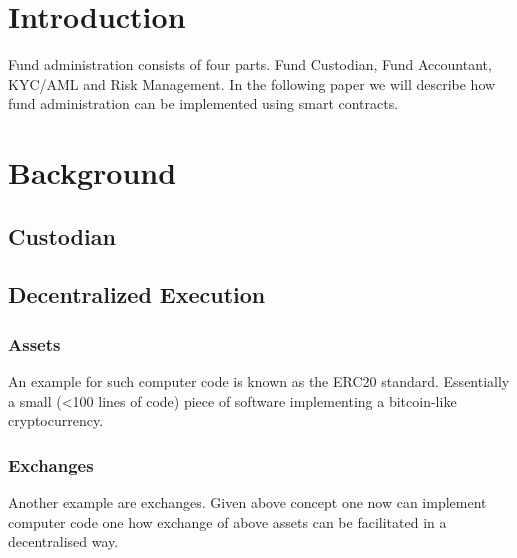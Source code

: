 \documentclass[conference]{IEEEtran}
\begin{document}




%
\IEEEpeerreviewmaketitle



\section{Introduction}

Fund administration consists of four parts. Fund Custodian, Fund Accountant, KYC/AML and Risk Management. In the following paper we will describe how fund administration can be implemented using smart contracts.

\section{Background}

\subsection{Custodian}

\subsection{Decentralized Execution}

\subsubsection{Assets}

An example for such computer code is known as the ERC20 standard. Essentially a small (<100 lines of code) piece of software implementing a bitcoin-like cryptocurrency.

\subsubsection{Exchanges}

Another example are exchanges. Given above concept one now can implement computer code one how exchange of above assets can be facilitated in a decentralised way.
\end{document}
